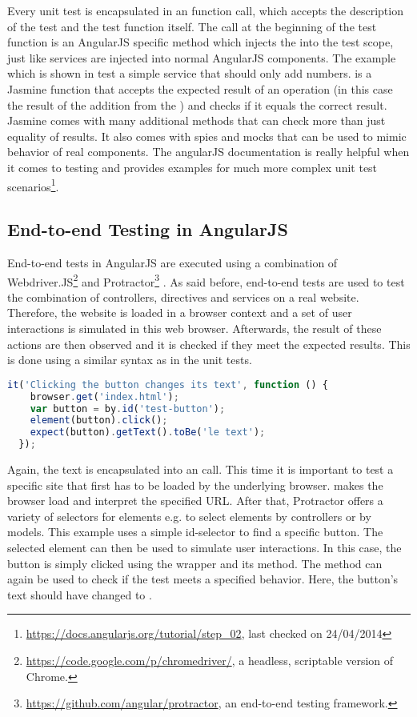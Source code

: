 Every unit test is encapsulated in an  function call, which accepts the description of the test and the test function itself. The  call at the beginning of the test function is an AngularJS specific method which injects the  into the test scope, just like services are injected into normal AngularJS components. The example which is shown in  test a simple service that should only add numbers.  is a Jasmine function that accepts the expected result of an operation (in this case the result of the addition from the ) and checks if it equals the correct result. Jasmine comes with many additional methods that can check more than just equality of results. It also comes with spies and mocks that can be used to mimic behavior of real components. The angularJS documentation is really helpful when it comes to testing and provides examples for much more complex unit test scenarios\footnote{\url{https://docs.angularjs.org/tutorial/step_02}, last checked on 24/04/2014}.

\subsection{End-to-end Testing in AngularJS}

End-to-end tests in AngularJS are executed using a combination of Webdriver.JS\footnote{\url{https://code.google.com/p/chromedriver/}, a headless, scriptable version of Chrome.} and Protractor\footnote{\url{https://github.com/angular/protractor}, an end-to-end testing framework.} \cite[chapter: E2E testing]{vermeersch2014}. As said before, end-to-end tests are used to test the combination of controllers, directives and services on a real website. Therefore, the website is loaded in a browser context and a set of user interactions is simulated in this web browser. Afterwards, the result of these actions are then observed and it is checked if they meet the expected results. This is done using a similar syntax as in the unit tests.

\begin{lstlisting}[language=JavaScript, caption=Ent-to-end testing in AngularJS, label=lst:testing-e2e]
  it('Clicking the button changes its text', function () {
    browser.get('index.html');
    var button = by.id('test-button');
    element(button).click();
    expect(button).getText().toBe('le text');
  });
\end{lstlisting}

Again, the text is encapsulated into an  call. This time it is important to test a specific site that first has to be loaded by the underlying browser.  makes the browser load and interpret the specified URL. After that, Protractor offers a variety of selectors for elements e.g. to select elements by controllers or by models. This example uses a simple id-selector to find a specific button. The selected element can then be used to simulate user interactions. In this case, the button is simply clicked using the  wrapper and its  method. The  method can again be used to check if the test meets a specified behavior. Here, the button's text should have changed to . 